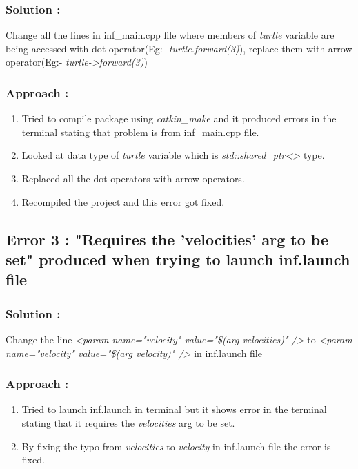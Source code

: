 \documentclass[12pt]{article}
\begin{document}
\subsubsection{Solution : }
Change all the lines in inf\_main.cpp file where members of \textit{turtle} variable are being accessed with dot operator(Eg:- \textit{turtle.forward(3)}), replace them with arrow operator(Eg:- \textit{turtle-\textgreater forward(3)})

\subsubsection{Approach :}
\begin{enumerate}
\item Tried to compile package using \textit{catkin\_make} and it produced errors in the terminal stating that problem is from  inf\_main.cpp file.
\item Looked at data type of \textit{turtle} variable which is \textit{std::shared\_ptr\textless\textgreater} type.
\item Replaced all the dot operators with arrow operators.
\item Recompiled the project and this error got fixed.
\end{enumerate}


\subsection{Error 3 : "Requires the 'velocities' arg to be set" produced when trying to launch inf.launch file}

\subsubsection{Solution : }
Change the line \textit{\textless param name="velocity" value="\$(arg velocities)" /\textgreater} to \textit{\textless param name="velocity" value="\$(arg velocity)" /\textgreater} in inf.launch file

\subsubsection{Approach :}
\begin{enumerate}
\item Tried to launch inf.launch in terminal but it shows error in the terminal stating that it requires the \textit{velocities} arg to be set.
\item By fixing the typo from \textit{velocities} to \textit{velocity} in inf.launch file the error is fixed.
\end{enumerate}
\end{document}
